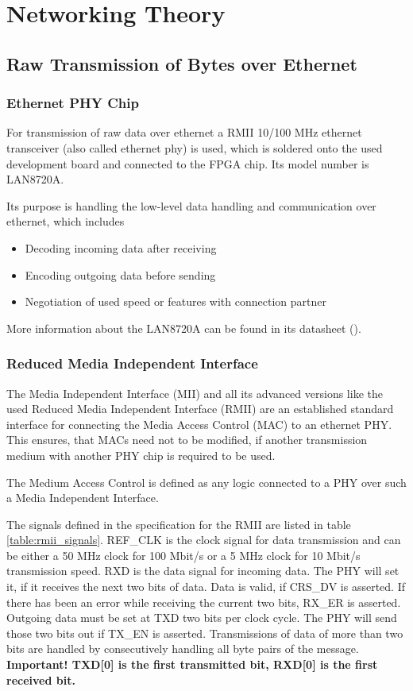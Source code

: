 \section{Networking Theory}

\subsection{Raw Transmission of Bytes over Ethernet}

\subsubsection{Ethernet PHY Chip}
For transmission of raw data over ethernet a RMII 10/100 MHz ethernet transceiver (also called ethernet phy) is used, which is soldered onto the used development board and connected to the FPGA chip. Its model number is LAN8720A.

Its purpose is handling the low-level data handling and communication over ethernet, which includes
\begin{itemize}
  \item Decoding incoming data after receiving
  \item Encoding outgoing data before sending
  \item Negotiation of used speed or features with connection partner
\end{itemize}

More information about the LAN8720A can be found in its datasheet (\cite{smsc:lan8720a}).

\subsubsection{Reduced Media Independent Interface}
The Media Independent Interface (MII) and all its advanced versions like the used Reduced Media Independent Interface (RMII) are an established standard interface for connecting the Media Access Control (MAC) to an ethernet PHY. This ensures, that MACs need not to be modified, if another transmission medium with another PHY chip is required to be used.

The Medium Access Control is defined as any logic connected to a PHY over such a Media Independent Interface.

The signals defined in the specification for the RMII are listed in table \ref{table:rmii_signals}. REF\_CLK is the clock signal for data transmission and can be either a 50 MHz clock for 100 Mbit/s or a 5 MHz clock for 10 Mbit/s transmission speed. RXD is the data signal for incoming data. The PHY will set it, if it receives the next two bits of data. Data is valid, if CRS\_DV is asserted. If there has been an error while receiving the current two bits, RX\_ER is asserted. Outgoing data must be set at TXD two bits per clock cycle. The PHY will send those two bits out if TX\_EN is asserted. Transmissions of data of more than two bits are handled by consecutively handling all byte pairs of the message. \textbf{Important! TXD[0] is the first transmitted bit, RXD[0] is the first received bit.}

